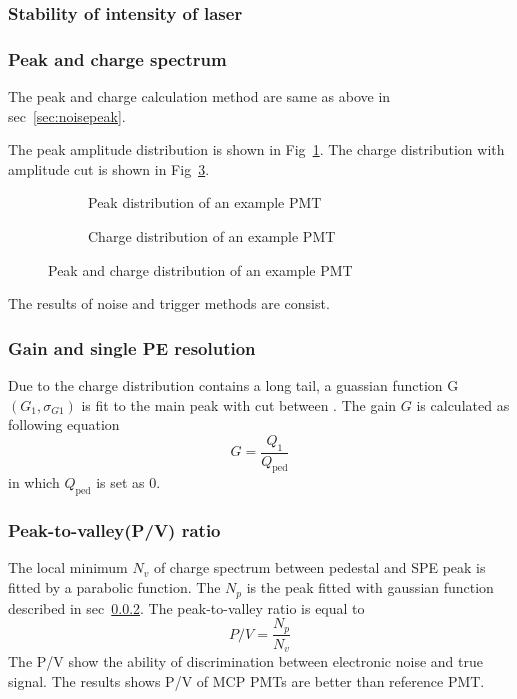 \subsubsection{Stability of intensity of laser}
\subsubsection{Peak and charge spectrum}
\label{sec:triggerpeak}
The peak and charge calculation method are same as above in sec~\ref{sec:noisepeak}.

The peak amplitude distribution is shown in Fig~\ref{fig:triggerpeak}. The charge distribution with amplitude cut is shown in Fig~\ref{fig:triggercharge}.
\begin{figure}[!htbp]
    \centering
    \begin{subfigure}[b]{0.35\textwidth}
        \caption{Peak distribution of an example PMT}%
        \label{fig:triggerpeak}
    \end{subfigure}
    \begin{subfigure}[b]{0.35\textwidth}
        \caption{Charge distribution of an example PMT}%
        \label{fig:triggercharge}
    \end{subfigure}
    \caption{Peak and charge distribution of an example PMT}
\end{figure}
The results of noise and trigger methods are consist.
\subsubsection{Gain and single PE resolution}
Due to the charge distribution contains a long tail, a guassian function G$(G_1,\sigma_{G1})$ is fit to the main peak with cut between . The gain $G$ is calculated as following equation
\begin{equation}
    G=\frac{Q_1}{Q_{\mathrm{ped}}}
\end{equation}
in which $Q_{\mathrm{ped}}$ is set as 0.
\subsubsection{Peak-to-valley(P/V) ratio}
The local minimum $N_v$ of charge spectrum between pedestal and SPE peak is fitted by a parabolic function. The $N_p$ is the peak fitted with gaussian function described in sec~\ref{sec:triggerpeak}.
The peak-to-valley ratio is equal to  
\begin{equation}
    P/V=\frac{N_p}{N_v}
\end{equation}
The P/V show the ability of discrimination between electronic noise and true signal. The results shows P/V of MCP PMTs are better than reference PMT.
